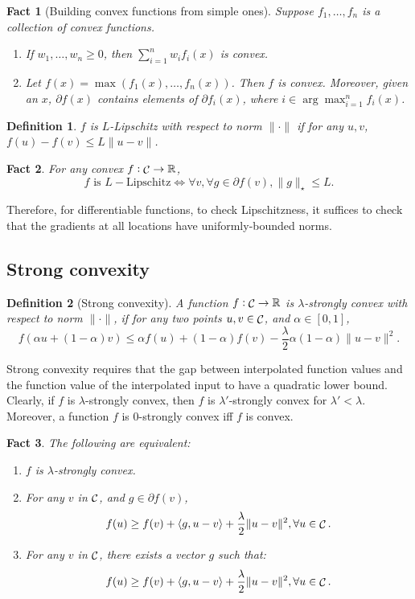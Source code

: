 \documentclass{article}
\newtheorem{definition}{Definition}
\newtheorem{fact}{Fact}
\DeclareMathOperator*{\Ccal}{{\cal C}}
\newcommand{\RR}{\mathbb{R}} %
\newcommand{\inner}[2]{\left\langle #1,#2 \right\rangle}
\begin{document}
\begin{fact}[Building convex functions from simple ones]
Suppose $f_1, \ldots, f_n$ is a collection of convex functions.
\begin{enumerate}
\item If $w_1,\ldots, w_n \geq 0$, then $\sum_{i=1}^n w_i f_i(x)$ is convex.

\item Let $f(x) = \max(f_1(x), \ldots, f_n(x))$. Then $f$ is convex. Moreover, given an $x$,
$\partial f(x)$ contains elements of $\partial f_{i}(x)$, where $i \in \arg\max_{i=1}^n f_i(x)$.
\end{enumerate}
\label{fact:build-cvx}
\end{fact}


\begin{definition}
$f$ is $L$-Lipschitz with respect to norm $\| \cdot \|$ if for any $u, v$, $f(u) - f(v) \leq L\| u - v\|$.
\end{definition}

\begin{fact}
For any convex $f: \Ccal \to \RR$,
\[ f \text{ is } L-\text{Lipschitz} \Leftrightarrow \forall v, \forall g \in \partial f(v), \| g \|_\star \leq L. \]
\end{fact}

Therefore, for differentiable functions, to check Lipschitzness, it suffices to check that the gradients at all locations have uniformly-bounded norms.

\subsection{Strong convexity}

\begin{definition}[Strong convexity]
A function $f: \Ccal \to \RR$ is $\lambda$-strongly convex with respect to norm $\| \cdot \|$, if for any two points
$u, v \in \Ccal$, and $\alpha \in [0,1]$,
\[ f(\alpha u + (1-\alpha)v) \leq \alpha f(u) + (1-\alpha) f(v) - \frac{\lambda}{2}\alpha(1-\alpha) \| u - v\|^2. \]
\end{definition}

Strong convexity requires that the gap between interpolated function values and the function value of the interpolated input to have a quadratic lower bound. Clearly, if $f$ is $\lambda$-strongly convex, then $f$ is $\lambda'$-strongly convex for $\lambda' < \lambda$. Moreover, a function $f$ is $0$-strongly convex iff $f$ is convex.

\begin{fact}
The following are equivalent:
\begin{enumerate}
  \item $f$ is $\lambda$-strongly convex.
  \item For any $v$ in $\Ccal$, and $g \in \partial f(v)$,
  \[ f(u) \geq f(v) + \inner{g}{u - v} + \frac{\lambda}{2}\| u - v\|^2, \forall u \in \Ccal. \]
  \item For any $v$ in $\Ccal$, there exists a vector $g$ such that:
  \[ f(u) \geq f(v) + \inner{g}{u - v} + \frac{\lambda}{2}\| u - v\|^2, \forall u \in \Ccal. \]
\end{enumerate}
\end{fact}
\end{document}
